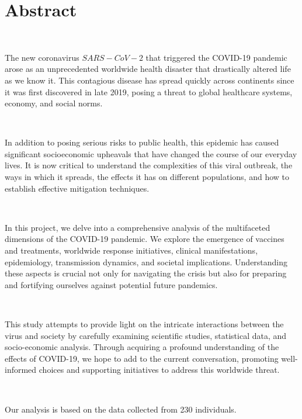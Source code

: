 \chapter{Abstract}

\

The new coronavirus $SARS-CoV-2$ that triggered the COVID-19 pandemic arose as an unprecedented worldwide health disaster that drastically altered life as we know it. This contagious disease has spread quickly across continents since it was first discovered in late 2019, posing a threat to global healthcare systems, economy, and social norms.

\

In addition to posing serious risks to public health, this epidemic has caused significant socioeconomic upheavals that have changed the course of our everyday lives. It is now critical to understand the complexities of this viral outbreak, the ways in which it spreads, the effects it has on different populations, and how to establish effective mitigation techniques.

\

In this project, we delve into a comprehensive analysis of the multifaceted dimensions of the COVID-19 pandemic. We explore the emergence of vaccines and treatments, worldwide response initiatives, clinical manifestations, epidemiology, transmission dynamics, and societal implications. Understanding these aspects is crucial not only for navigating the crisis but also for preparing and fortifying ourselves against potential future pandemics.

\

This study attempts to provide light on the intricate interactions between the virus and society by carefully examining scientific studies, statistical data, and socio-economic analysis. Through acquiring a profound understanding of the effects of COVID-19, we hope to add to the current conversation, promoting well-informed choices and supporting initiatives to address this worldwide threat.

\

Our analysis is based on the data collected from 230 individuals. 